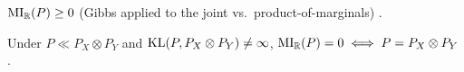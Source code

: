 \begin{thm}
\label{thm:mi-nonneg}
  \leanok
$\mathrm{MI}_{\mathbb{R}}(P) \ge 0$ (Gibbs applied to the joint vs.\ product-of-marginals)
\cite[Thm 2.6.3]{cover-thomas}.
\end{thm}

\begin{thm}
\label{thm:mi-zero-iff}
  \leanok
Under $P \ll P_X \otimes P_Y$ and $\mathrm{KL}(P, P_X \otimes P_Y) \ne \infty$,
$\mathrm{MI}_{\mathbb{R}}(P) = 0 \iff P = P_X \otimes P_Y$
\cite[Thm 2.6.5]{cover-thomas}.
\end{thm}
